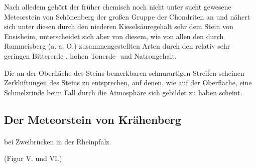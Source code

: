 \documentclass[a4paper, 11pt, oneside]{article}
\begin{document}
Nach alledem gehört der früher chemisch noch nicht unter sucht gewesene Meteorstein von Schönenberg der großen Gruppe der Chondriten an und nähert sich unter diesen durch den niederen Kieselsäuregehalt sehr dem Stein von Ensisheim, unterscheidet sich aber von diesem, wie von allen den durch Rammeisberg (a. a. O.) zusammengestellten Arten durch den relativ sehr geringen Bittererde-, hohen Tonerde- und Natrongehalt.

Die an der Oberfläche des Steins bemerkbaren schnurartigen Streifen scheinen Zerklüftungen des Steins zu entsprechen, auf denen, wie auf der Oberfläche, eine Schmelzrinde beim Fall durch die Atmosphäre sich gebildet zu haben scheint.
\clearpage
\subsection{Der Meteorstein von Krähenberg}
\paragraph{}
bei Zweibrücken in der Rheinpfalz.

(Figur V. und VI.)
\end{document}
